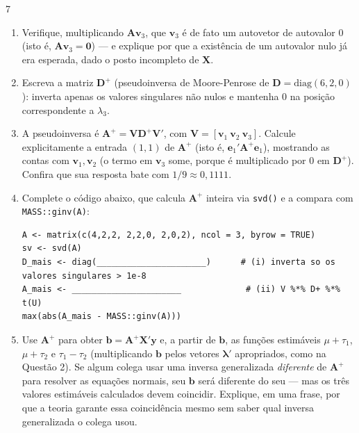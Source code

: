 \documentclass[11pt]{article}
\begin{document}
\begin{questao}{7}
\begin{enumerate}[label=(\alph*)]
  \item Verifique, multiplicando $\mathbf{A}\mathbf{v}_3$, que $\mathbf{v}_3$ é de fato um
    autovetor de autovalor $0$ (isto é, $\mathbf{A}\mathbf{v}_3 = \mathbf{0}$) --- e explique por
    que a existência de um autovalor nulo já era esperada, dado o posto incompleto de
    $\mathbf{X}$.
  \item Escreva a matriz $\mathbf{D}^+$ (pseudoinversa de Moore-Penrose de $\mathbf{D} =
    \mathrm{diag}(6,2,0)$): inverta apenas os valores singulares não nulos e mantenha $0$ na
    posição correspondente a $\lambda_3$.
  \item A pseudoinversa é $\mathbf{A}^+ = \mathbf{V}\mathbf{D}^+\mathbf{V}'$, com $\mathbf{V} =
    [\mathbf{v}_1\ \mathbf{v}_2\ \mathbf{v}_3]$. Calcule explicitamente a entrada $(1,1)$ de
    $\mathbf{A}^+$ (isto é, $\mathbf{e}_1'\mathbf{A}^+\mathbf{e}_1$), mostrando as contas com
    $\mathbf{v}_1, \mathbf{v}_2$ (o termo em $\mathbf{v}_3$ some, porque é multiplicado por $0$ em
    $\mathbf{D}^+$). Confira que sua resposta bate com $1/9 \approx 0{,}1111$.
  \item Complete o código abaixo, que calcula $\mathbf{A}^+$ inteira via \texttt{svd()} e a compara
    com \texttt{MASS::ginv(A)}:
\begin{lstlisting}
A <- matrix(c(4,2,2, 2,2,0, 2,0,2), ncol = 3, byrow = TRUE)
sv <- svd(A)
D_mais <- diag(______________________)      # (i) inverta so os valores singulares > 1e-8
A_mais <- ______________________             # (ii) V %*% D+ %*% t(U)
max(abs(A_mais - MASS::ginv(A)))
\end{lstlisting}
  \item Use $\mathbf{A}^+$ para obter $\mathbf{b} = \mathbf{A}^+\mathbf{X}'\mathbf{y}$ e, a partir
    de $\mathbf{b}$, as funções estimáveis $\mu+\tau_1$, $\mu+\tau_2$ e $\tau_1-\tau_2$
    (multiplicando $\mathbf{b}$ pelos vetores $\boldsymbol\lambda'$ apropriados, como na Questão
    2). Se algum colega usar uma inversa generalizada \emph{diferente} de $\mathbf{A}^+$ para
    resolver as equações normais, seu $\mathbf{b}$ será diferente do seu --- mas os três valores
    estimáveis calculados devem coincidir. Explique, em uma frase, por que a teoria garante essa
    coincidência mesmo sem saber qual inversa generalizada o colega usou.
\end{enumerate}
\end{questao}
\end{document}
